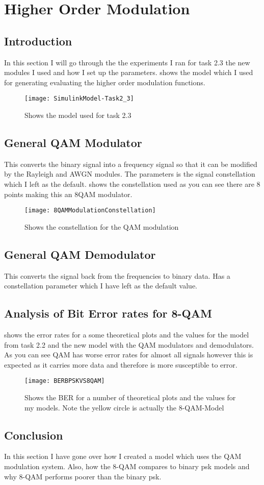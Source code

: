 \section{Higher Order Modulation}{
	\subsection{Introduction}
	{
		In this section I will go through the the experiments I ran for task 2.3 the new modules I used and how I set up the parameters.  shows the model which I used for generating evaluating the higher order modulation functions.
		\begin{figure}
			\centering
			\texttt{[image: SimulinkModel-Task2\_3]}
			\caption{Shows the model used for task 2.3}
			\label{fig:2.3SimlinkModel}
		\end{figure}
	}
	\subsection{General QAM Modulator}
	{
		This converts the binary signal into a frequency signal so that it can be modified by the Rayleigh and AWGN modules. The parameters is the signal constellation which I left as the default.  shows the constellation used as you can see there are 8 points making this an 8QAM modulator.
		\begin{figure}
			\centering
			\texttt{[image: 8QAMModulationConstellation]}
			\caption{Shows the constellation for the QAM modulation}
			\label{fig:8QAMModulationConsetllation}
		\end{figure}
	}
	
	\subsection{General QAM Demodulator}
	{
		This converts the signal back from the frequencies to binary data. Has a constellation parameter which I have left as the default value.
	}
	\subsection{Analysis of Bit Error rates for 8-QAM}
	{
		 shows the error rates for a some theoretical plots and the values for the model from task 2.2 and the new model with the QAM modulators and demodulators. As you can see QAM has worse error rates for almost all signals however this is expected as it carries more data and therefore is more susceptible to error.
		\begin{figure}
			\centering
			\texttt{[image: BERBPSKVS8QAM]}
			\caption{Shows the BER for a number of theoretical plots and the values for my models. Note the yellow circle is actually the 8-QAM-Model}
			\label{fig:BERBPSKVS8QAM}
		\end{figure}
	}
	\subsection{Conclusion}
	{
		In this section I have gone over how I created a model which uses the QAM modulation system. Also, how the 8-QAM compares to binary psk models and why 8-QAM performs poorer than the binary psk.
	}
}